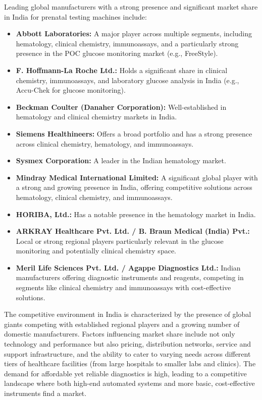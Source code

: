 \documentclass{article}
\begin{document}
Leading global manufacturers with a strong presence and significant market share in India for prenatal testing machines include:
\begin{itemize}
    \item \textbf{Abbott Laboratories:} A major player across multiple segments, including hematology, clinical chemistry, immunoassays, and a particularly strong presence in the POC glucose monitoring market (e.g., FreeStyle).
    \item \textbf{F. Hoffmann-La Roche Ltd.:} Holds a significant share in clinical chemistry, immunoassays, and laboratory glucose analysis in India (e.g., Accu-Chek for glucose monitoring).
    \item \textbf{Beckman Coulter (Danaher Corporation):} Well-established in hematology and clinical chemistry markets in India.
    \item \textbf{Siemens Healthineers:} Offers a broad portfolio and has a strong presence across clinical chemistry, hematology, and immunoassays.
    \item \textbf{Sysmex Corporation:} A leader in the Indian hematology market.
    \item \textbf{Mindray Medical International Limited:} A significant global player with a strong and growing presence in India, offering competitive solutions across hematology, clinical chemistry, and immunoassays.
    \item \textbf{HORIBA, Ltd.:} Has a notable presence in the hematology market in India.
    \item \textbf{ARKRAY Healthcare Pvt. Ltd. / B. Braun Medical (India) Pvt.:} Local or strong regional players particularly relevant in the glucose monitoring and potentially clinical chemistry space.
    \item \textbf{Meril Life Sciences Pvt. Ltd. / Agappe Diagnostics Ltd.:} Indian manufacturers offering diagnostic instruments and reagents, competing in segments like clinical chemistry and immunoassays with cost-effective solutions.
\end{itemize}
The competitive environment in India is characterized by the presence of global giants competing with established regional players and a growing number of domestic manufacturers. Factors influencing market share include not only technology and performance but also pricing, distribution networks, service and support infrastructure, and the ability to cater to varying needs across different tiers of healthcare facilities (from large hospitals to smaller labs and clinics). The demand for affordable yet reliable diagnostics is high, leading to a competitive landscape where both high-end automated systems and more basic, cost-effective instruments find a market.
\end{document}
